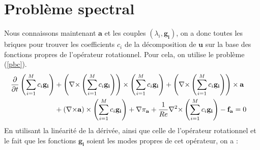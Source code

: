 \section{Problème spectral}
\label{spectre}
Nous connaissons maintenant $\mathbf{a}$ et les couples $(\lambda_i,\mathbf{g_i})$, on a donc toutes les briques pour trouver les coefficients $c_i$ de la décomposition de $\mathbf{u}$ sur la base des fonctions propres de l'opérateur rotationnel. Pour cela, on utilise le problème (\ref{pbc}).
\begin{align*}
\frac{\partial}{\partial t}\left(\sum_{i=1}^M c_i\mathbf{g_i}\right) &+ \left({\nabla\times} \left(\sum_{i=1}^Mc_i\mathbf{g_i}\right)\right)\times \left(\sum_{i=1}^Mc_i\mathbf{g_i}\right) + \left({\nabla\times} \left(\sum_{i=1}^Mc_i\mathbf{g_i}\right)\right)\times \mathbf{a}&\\
&+ ({\nabla\times} \mathbf{a})\times \left(\sum_{i=1}^Mc_i\mathbf{g_i}\right) + {\nabla} \pi_{\mathbf{a}} +\frac{1}{Re}{\nabla^2\times}  \left(\sum_{i=1}^Mc_i\mathbf{g_i}\right) - \mathbf{f_a} =0\\
\end{align*}
En utilisant la linéarité de la dérivée, ainsi que celle de l'opérateur rotationnel et le fait que les fonctions $\mathbf{g_i}$ soient les modes propres de cet opérateur, on a :


